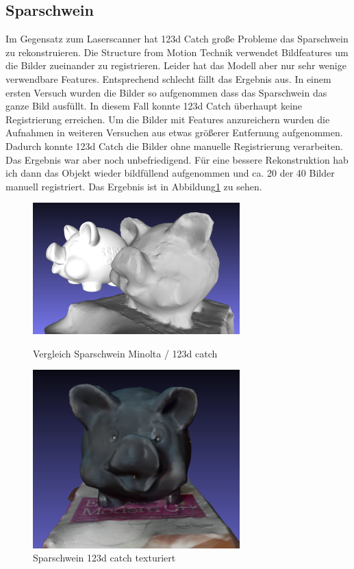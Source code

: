 \documentclass[]{article}
\begin{document}
\subsection{Sparschwein}
Im Gegensatz zum Laserscanner hat 123d Catch große Probleme das Sparschwein zu rekonstruieren. Die Structure from Motion Technik verwendet Bildfeatures um die Bilder zueinander zu registrieren. Leider hat das Modell aber nur sehr wenige verwendbare Features. Entsprechend schlecht fällt das Ergebnis aus. In einem ersten Versuch wurden die Bilder so aufgenommen dass das Sparschwein das ganze Bild ausfüllt. In diesem Fall konnte 123d Catch überhaupt keine Registrierung erreichen. Um die Bilder mit Features anzureichern wurden die Aufnahmen in weiteren Versuchen aus etwas größerer Entfernung aufgenommen. Dadurch konnte 123d Catch die Bilder ohne manuelle Registrierung verarbeiten. Das Ergebnis war aber noch unbefriedigend. 
Für eine bessere Rekonstruktion hab ich dann das Objekt wieder bildfüllend aufgenommen und ca. 20 der 40 Bilder manuell registriert. Das Ergebnis ist in 
Abbildung\ref{fig:piggy_vergleich} zu sehen.

\begin{figure}[p]
\caption{Vergleich Sparschwein Minolta / 123d catch}
\centering
\includegraphics[width=80mm]{images/sparschwein/123d_Vergleich} %
\label{fig:piggy_vergleich}
\end{figure}

\begin{figure}[p]
\caption{Sparschwein 123d catch texturiert}
\centering
\includegraphics[width=80mm]{images/sparschwein/123d_Texture} %
\end{figure}
\end{document}

